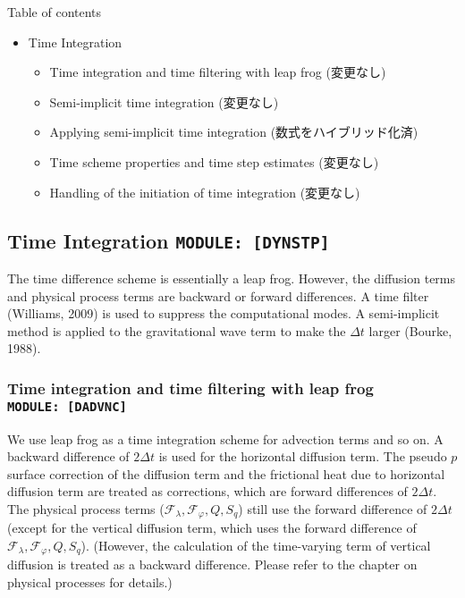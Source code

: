 Table of contents

\begin{itemize}
\tightlist
\item
  Time Integration

  \begin{itemize}
  \tightlist
  \item
    Time integration and time filtering with leap frog (変更なし)
  \item
    Semi-implicit time integration (変更なし)
  \item
    Applying semi-implicit time integration (数式をハイブリッド化済)
  \item
    Time scheme properties and time step estimates (変更なし)
  \item
    Handling of the initiation of time integration (変更なし)
  \end{itemize}
\end{itemize}

\hypertarget{time-integration-module-dynstp}{%
\subsection{\texorpdfstring{Time Integration
\texttt{MODULE:\ {[}DYNSTP{]}}}{Time Integration MODULE: {[}DYNSTP{]}}}\label{time-integration-module-dynstp}}

The time difference scheme is essentially a leap frog. However, the
diffusion terms and physical process terms are backward or forward
differences. A time filter (Williams, 2009) is used to suppress the
computational modes. A semi-implicit method is applied to the
gravitational wave term to make the \(\Delta t\) larger (Bourke, 1988).

\hypertarget{time-integration-and-time-filtering-with-leap-frog-module-dadvnc}{%
\subsubsection{\texorpdfstring{Time integration and time filtering with
leap frog
\texttt{MODULE:\ {[}DADVNC{]}}}{Time integration and time filtering with leap frog MODULE: {[}DADVNC{]}}}\label{time-integration-and-time-filtering-with-leap-frog-module-dadvnc}}

We use leap frog as a time integration scheme for advection terms and so
on. A backward difference of \(2 \Delta t\) is used for the horizontal
diffusion term. The pseudo \(p\) surface correction of the diffusion
term and the frictional heat due to horizontal diffusion term are
treated as corrections, which are forward differences of \(2 \Delta t\).
The physical process terms
(\({\mathcal F}_\lambda, {\mathcal F}_\varphi, Q, S_q\)) still use the
forward difference of \(2 \Delta t\) (except for the vertical diffusion
term, which uses the forward difference of
\({\mathcal F}_\lambda, {\mathcal F}_\varphi, Q, S_q\)). (However, the
calculation of the time-varying term of vertical diffusion is treated as
a backward difference. Please refer to the chapter on physical processes
for details.)

